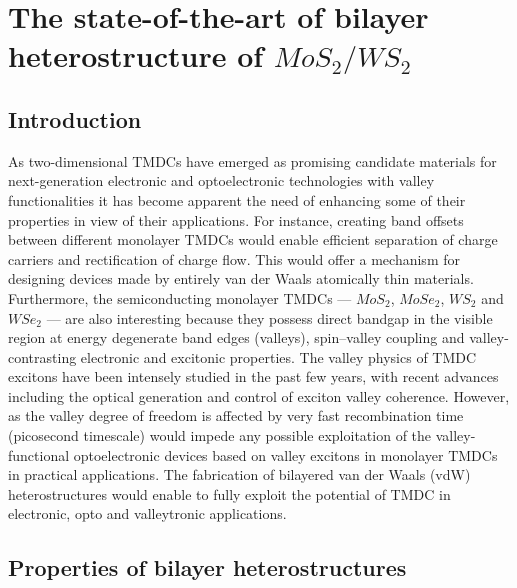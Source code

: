 \chapter{The state-of-the-art of bilayer heterostructure of $MoS_2/WS_2$}

\section{Introduction}

As two-dimensional TMDCs have emerged as promising candidate materials for next-generation electronic and optoelectronic technologies with valley functionalities it has become apparent the need of enhancing some of their properties in view of their applications. For instance, creating band offsets between different monolayer TMDCs would enable efficient separation of charge carriers and rectification of charge flow. This would offer a mechanism for designing devices made by entirely van der Waals atomically thin materials.  Furthermore, the semiconducting monolayer TMDCs — $MoS_2$, $MoSe_2$, $WS_2$ and $WSe_2$ — are also interesting because they possess direct bandgap in the visible region at energy degenerate band edges (valleys), spin–valley coupling and valley-contrasting electronic and excitonic properties.
 The valley physics of TMDC excitons have been intensely studied in the past few years, with recent advances including the optical generation and control of exciton valley coherence. However, as the valley degree of freedom is affected by very fast recombination time (picosecond timescale) would impede any possible exploitation of the valley-functional optoelectronic devices based on valley excitons in monolayer TMDCs in practical applications. The fabrication of bilayered van der Waals (vdW) heterostructures would enable to fully exploit the potential of TMDC in electronic, opto and valleytronic applications.

\section{Properties of bilayer heterostructures}

